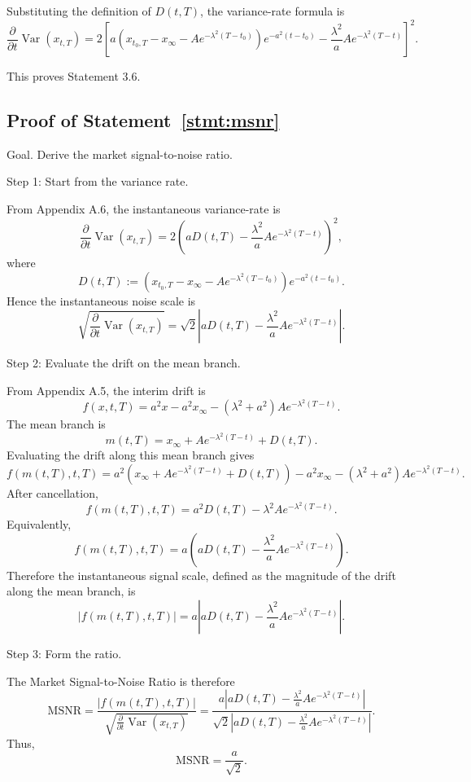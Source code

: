 \documentclass[12pt]{article}
\theoremstyle{statementstyle}
\begin{document}
\begin{appendices}
Substituting the definition of \(D(t,T)\), the variance-rate formula is
\[
\boxed{
\frac{\partial}{\partial t}\operatorname{Var}(x_{t,T})
=
2\left[
a\left(
x_{t_0,T}
-
x_\infty
-
Ae^{-\lambda^2(T-t_0)}
\right)
e^{-a^2(t-t_0)}
-
\frac{\lambda^2}{a}Ae^{-\lambda^2(T-t)}
\right]^2.
}
\label{eq:interim_inst_variance}\tag{A.6.1}
\]


This proves Statement 3.6.
\subsection{Proof of Statement~\ref{stmt:msnr}}
\label{appendix:A7}

Goal. Derive the market signal-to-noise ratio.

Step 1: Start from the variance rate.

From Appendix A.6, the instantaneous variance-rate is
\[
\frac{\partial}{\partial t}\operatorname{Var}(x_{t,T})
=
2\left(
aD(t,T)
-
\frac{\lambda^2}{a}Ae^{-\lambda^2(T-t)}
\right)^2,
\]
where
\[
D(t,T)
:=
\left(
x_{t_0,T}
-
x_\infty
-
Ae^{-\lambda^2(T-t_0)}
\right)
e^{-a^2(t-t_0)}.
\]
Hence the instantaneous noise scale is
\[
\sqrt{
\frac{\partial}{\partial t}\operatorname{Var}(x_{t,T})
}
=
\sqrt{2}
\left|
aD(t,T)
-
\frac{\lambda^2}{a}Ae^{-\lambda^2(T-t)}
\right|.
\]

Step 2: Evaluate the drift on the mean branch.

From Appendix A.5, the interim drift is
\[
f(x,t,T)
=
a^2x
-
a^2x_\infty
-
(\lambda^2+a^2)Ae^{-\lambda^2(T-t)}.
\]
The mean branch is
\[
m(t,T)
=
x_\infty
+
Ae^{-\lambda^2(T-t)}
+
D(t,T).
\]
Evaluating the drift along this mean branch gives
\[
f(m(t,T),t,T)
=
a^2\left(
x_\infty
+
Ae^{-\lambda^2(T-t)}
+
D(t,T)
\right)
-
a^2x_\infty
-
(\lambda^2+a^2)Ae^{-\lambda^2(T-t)}.
\]
After cancellation,
\[
f(m(t,T),t,T)
=
a^2D(t,T)
-
\lambda^2Ae^{-\lambda^2(T-t)}.
\]
Equivalently,
\[
f(m(t,T),t,T)
=
a\left(
aD(t,T)
-
\frac{\lambda^2}{a}Ae^{-\lambda^2(T-t)}
\right).
\]
Therefore the instantaneous signal scale, defined as the magnitude of the drift along the
mean branch, is
\[
|f(m(t,T),t,T)|
=
a
\left|
aD(t,T)
-
\frac{\lambda^2}{a}Ae^{-\lambda^2(T-t)}
\right|.
\]

Step 3: Form the ratio.

The Market Signal-to-Noise Ratio is therefore
\[
\mathrm{MSNR}
=
\frac{|f(m(t,T),t,T)|}
{\sqrt{\frac{\partial}{\partial t}\operatorname{Var}(x_{t,T})}}
=
\frac{
a
\left|
aD(t,T)
-
\frac{\lambda^2}{a}Ae^{-\lambda^2(T-t)}
\right|
}{
\sqrt{2}
\left|
aD(t,T)
-
\frac{\lambda^2}{a}Ae^{-\lambda^2(T-t)}
\right|
}.
\]
Thus,
\[
\boxed{
\mathrm{MSNR}
=
\frac{a}{\sqrt{2}}.
}
\]


\end{appendices}
\end{document}
